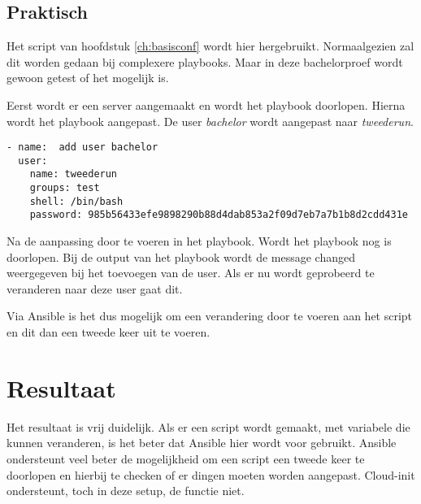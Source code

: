 \subsection{Praktisch}

Het script van hoofdstuk \ref*{ch:basisconf} wordt hier hergebruikt. Normaalgezien zal dit worden gedaan bij complexere playbooks. Maar in deze bachelorproef wordt gewoon getest of het mogelijk is.

Eerst wordt er een server aangemaakt en wordt het playbook doorlopen. Hierna wordt het playbook aangepast. De user \textit{bachelor} wordt aangepast naar \textit{tweederun}.
\begin{lstlisting}
- name:  add user bachelor
  user:
    name: tweederun
    groups: test
    shell: /bin/bash
    password: 985b56433efe9898290b88d4dab853a2f09d7eb7a7b1b8d2cdd431e
\end{lstlisting}

Na de aanpassing door te voeren in het playbook. Wordt het playbook nog is doorlopen. Bij de output van het playbook wordt de message changed weergegeven bij het toevoegen van de user. Als er nu wordt geprobeerd te veranderen naar deze user gaat dit.

Via Ansible is het dus mogelijk om een verandering door te voeren aan het script en dit dan een tweede keer uit te voeren.

\section{Resultaat}
Het resultaat is vrij duidelijk. Als er een script wordt gemaakt, met variabele die kunnen veranderen, is het beter dat Ansible hier wordt voor gebruikt. Ansible ondersteunt veel beter de mogelijkheid om een script een tweede keer te doorlopen en hierbij te checken of er dingen moeten worden aangepast. Cloud-init ondersteunt, toch in deze setup, de functie niet.


